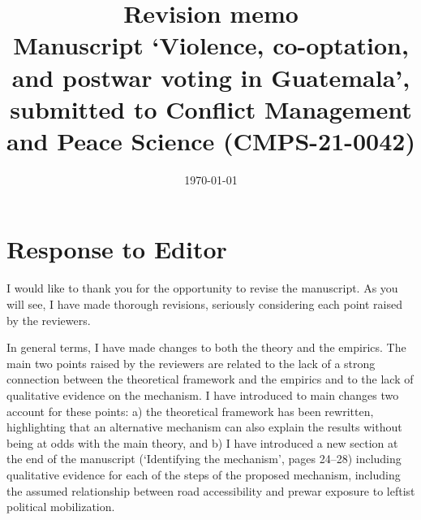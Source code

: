 \documentclass[12pt, a4paper, notitlepage]{article}
\title{\Large \textbf{Revision memo}\\{\large Manuscript `Violence, co-optation, and postwar voting in Guatemala', submitted to Conflict Management and Peace Science (CMPS-21-0042)}}
\author{}
\date{\today}
\begin{document}
\maketitle

\section*{Response to Editor}


I would like to thank you for the opportunity to revise the manuscript. As you will see, I have made thorough revisions, seriously considering each point raised by the reviewers.

In general terms, I have made changes to both the theory and the empirics. The main two points raised by the reviewers are related to the lack of a strong connection between the theoretical framework and the empirics and to the lack of qualitative evidence on the mechanism. I have introduced to main changes two account for these points: a) the theoretical framework has been rewritten, highlighting that an alternative mechanism can also explain the results without being at odds with the main theory, and b) I have introduced a new section at the end of the manuscript (`Identifying the mechanism', pages 24--28) including qualitative evidence for each of the steps of the proposed mechanism, including the assumed relationship between road accessibility and prewar exposure to leftist political mobilization.
\end{document}

